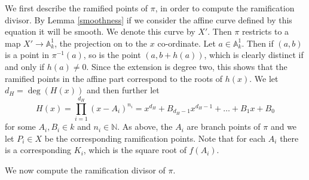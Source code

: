 We first describe the ramified points of $\pi$, in order to compute the ramification divisor.
By Lemma \ref{smoothness} if we consider the affine curve defined by this equation it will be smooth.
We denote this curve by $X'$.
Then $\pi$ restricts to a map $X'\rightarrow \mathbb A^1_k$, the projection on to the $x$ co-ordinate.
Let $a\in \mathbb A_k^1$.
Then if $(a,b)$ is a point in $\pi^{-1}(a)$, so is the point $(a,b+h(a))$, which is clearly distinct if and only if $h(a)\neq 0$.
Since the extension is degree two, this shows that the ramified points in the affine part correspond to the roots of $h(x)$.
We let $d_H = \deg(H(x))$ and then further let
    \begin{equation}\label{equationcapitalh}
    H(x) = \prod_{i=1}^{d_H} (x-A_i)^{n_i} = x^{d_H} + B_{{d_H}-1}x^{{d_H}-1} + \ldots + B_1x + B_0
    \end{equation}
for some $A_i, B_i \in  k$ and $n_i \in \mathbb N$.
As above, the $A_i$ are branch points of $\pi$ and we let $P_i \in X$ be the corresponding ramification points.
Note that for each $A_i$ there is a corresponding $K_i$, which is the square root of $f(A_i)$.

We now compute the ramification divisor of $\pi$.


